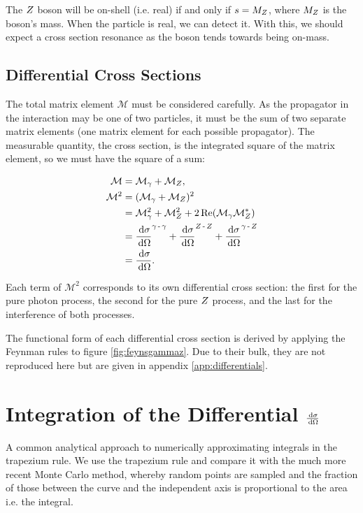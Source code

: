 \documentclass[]{article}
\begin{document}
The $Z $ boson will be on-shell (i.e. real) if and only if $s = M_{Z }$, where $M_{Z }$ is the boson's mass. When the particle is real, we can detect it. With this, we should expect a cross section resonance as the boson tends towards being on-mass.

\subsection{Differential Cross Sections}

The total matrix element $\mathcal{M}$ must be considered carefully. As the propagator in the interaction may be one of two particles, it must be the sum of two separate matrix elements (one matrix element for each possible propagator). The measurable quantity, the cross section, is the integrated square of the matrix element, so we must have the square of a sum:

\begin{align*}
\mathcal{M} &= \mathcal{M}_{\gamma} + \mathcal{M}_{\Zzero},
\\
\mathcal{M}^{2} &= (\mathcal{M}_{\gamma} + \mathcal{M}_{\Zzero})^{2}
\\
&= \mathcal{M}_{\gamma}^{2} + \mathcal{M}_{\Zzero}^{2} + 2\operatorname{Re}(\mathcal{M}_{\gamma}\mathcal{M}_{\Zzero}^{*})
\\
&= \frac{\d{\sigma}}{\d{\Omega}}^{\gamma\operatorname{-}\gamma} +
	\frac{\d{\sigma}}{\d{\Omega}}^{\Zzero\operatorname{-}\Zzero} +
	\frac{\d{\sigma}}{\d{\Omega}}^{\gamma\operatorname{-}\Zzero}
\\
&= \frac{\d{\sigma}}{\d{\Omega}}.
\end{align*}

Each term of $\mathcal{M}^{2}$ corresponds to its own differential cross section: the first for the pure photon process, the second for the pure $Z $ process, and the last for the interference of both processes.

The functional form of each differential cross section is derived by applying the Feynman rules to figure \ref{fig:feynsgammaz}. Due to their bulk, they are not reproduced here but are given in appendix \ref{app:differentials}.


\section{Integration of the Differential $\frac{\,\operatorname{d}\!{\sigma}}{\,\operatorname{d}\!{\Omega}}$}\label{sec:integration}

A common analytical approach to numerically approximating integrals in the trapezium rule. We use the trapezium rule and compare it with the much more recent Monte Carlo method, whereby random points are sampled and the fraction of those between the curve and the independent axis is proportional to the area i.e. the integral.
\end{document}
